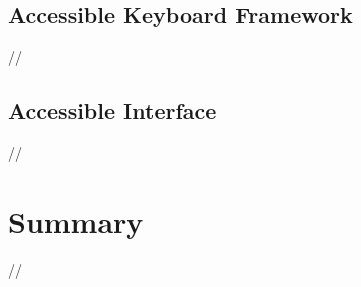 \subsection{Accessible Keyboard Framework}
//

\subsection{Accessible Interface}
//


\section{Summary}
//